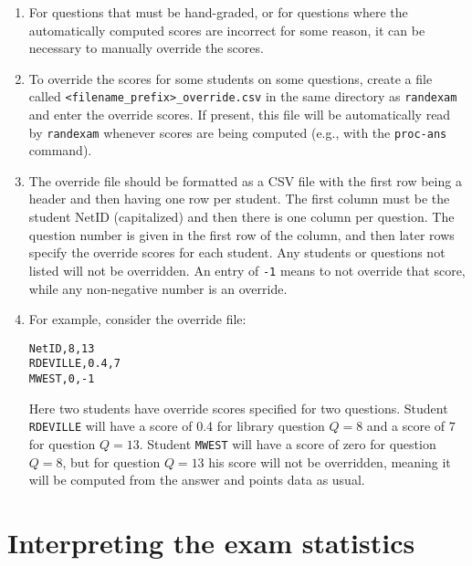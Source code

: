 \documentclass{article}
\begin{document}
\begin{enumerate}
\item For questions that must be hand-graded, or for questions where
  the automatically computed scores are incorrect for some reason, it
  can be necessary to manually override the scores.
\item To override the scores for some students on some questions,
  create a file called \texttt{<filename_prefix>_override.csv} in the
  same directory as \texttt{randexam} and enter the override
  scores. If present, this file will be automatically read by
  \texttt{randexam} whenever scores are being computed (e.g., with the
  \texttt{proc-ans} command).
\item The override file should be formatted as a CSV file with the
  first row being a header and then having one row per student. The
  first column must be the student NetID (capitalized) and then there
  is one column per question. The question number is given in the
  first row of the column, and then later rows specify the override
  scores for each student. Any students or questions not listed will
  not be overridden. An entry of \texttt{-1} means to not override
  that score, while any non-negative number is an override.
\item For example, consider the override file:
\begin{verbatim}
NetID,8,13
RDEVILLE,0.4,7
MWEST,0,-1
\end{verbatim}
  Here two students have override scores specified for two
  questions. Student \texttt{RDEVILLE} will have a score of 0.4 for
  library question $Q = 8$ and a score of $7$ for question $Q =
  13$. Student \texttt{MWEST} will have a score of zero for question
  $Q = 8$, but for question $Q = 13$ his score will not be overridden,
  meaning it will be computed from the answer and points data as
  usual.
\end{enumerate}

\section{Interpreting the exam statistics}
\end{document}
